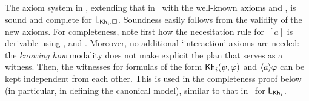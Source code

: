 
The axiom system in , extending that in~ with the well-known axioms  and , is sound and complete for $\mathsf{L}_{{\sf Kh}_i,\square}$. Soundness easily follows from the validity of the new axioms. For completeness, note first how the necesitation rule for~$[a]$ is derivable using ,  and . Moreover, no additional `interaction' axioms are needed: the \emph{knowing how} modality does not make explicit the plan that serves as a witness. Then, the witnesses for formulas of the form ${\sf Kh}_i(\psi,\varphi)$ and $\langle a \rangle\varphi$ can be kept independent from each other. This is used in the completeness proof below (in particular, in defining the canonical model), similar to that in~\cite{AFSVQ21,AFSVQ23report} for $\mathsf{L}_{{\sf Kh}_i}$.

\medskip







